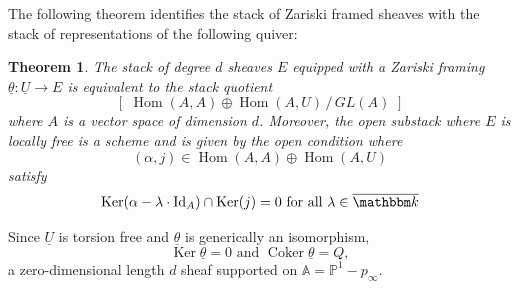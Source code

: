 \message{ !name(Bryan-Vakil.tex)}\documentclass{amsart}
\newtheorem{theorem}{Theorem}[section]
\theoremstyle{definition}
\newcommand{\kk} {{\mathbbm k}}
\renewcommand{\AA} {{\mathbb A}}
\newcommand{\PP}{\mathbb{P}}
\newcommand{\Hom}{\operatorname{Hom}}
\newcommand{\Ker}{\operatorname{Ker}}
\newcommand{\Coker}{\operatorname{Coker}}
\newcommand{\UL}[1]{\underline{#1}}
\newcommand{\Id}{\operatorname{Id}}
\begin{document}
The following theorem identifies the stack of Zariski framed sheaves
with the stack of representations of the following quiver:

\begin{center}
\end{center}

\begin{theorem}\label{thm: stack of Zariski framed sheaves is
equivalent to stack of quiver representation}
The stack of degree $d$ sheaves $E$ equipped with a Zariski framing
$\UL{\theta}: \UL{U}\to E$ is equivalent to the stack quotient
\[
[\,\,\Hom (A,A)\oplus \Hom (A,U) \,/\, GL(A)\,\, ]
\]
where $A$ is a vector space of dimension $d$. Moreover, the open
substack where $E$ is locally free is a scheme and is given by the
open condition where 
\[
(\alpha ,j)\in \Hom (A,A)\oplus \Hom (A,U) 
\]
satisfy 
\begin{equation}\label{eqn: open condition involving ker j}
\Ker (\alpha -\lambda \cdot \Id_{A})\cap \Ker (j) = 0\text{ for all }\lambda \in \overline{\kk }
\end{equation}
\end{theorem}

\proof Since $\UL{U}$ is torsion free and $\UL{\theta}$ is generically
an isomorphism,
\[
\Ker \UL{\theta}=0\text{ and } \Coker \UL{\theta}=Q ,
\]
a zero-dimensional length $d$ sheaf supported on $\AA=\PP^{1}-p_{\infty}$.
\end{document}
